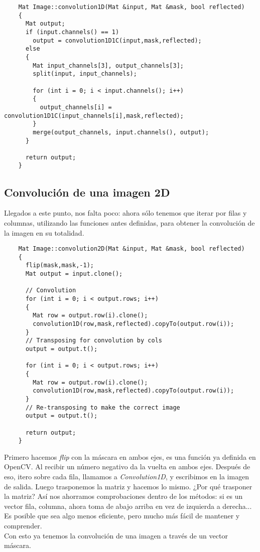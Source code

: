 \documentclass[a4paper, 11pt]{article}
\theoremstyle{definition}
\begin{document}
  \begin{lstlisting}
    Mat Image::convolution1D(Mat &input, Mat &mask, bool reflected)
    {
      Mat output;
      if (input.channels() == 1)
        output = convolution1D1C(input,mask,reflected);
      else
      {
        Mat input_channels[3], output_channels[3];
        split(input, input_channels);

        for (int i = 0; i < input.channels(); i++)
        {
          output_channels[i] = convolution1D1C(input_channels[i],mask,reflected);
        }
        merge(output_channels, input.channels(), output);
      }

      return output;
    }
  \end{lstlisting}

  \subsection{Convolución de una imagen 2D}

  Llegados a este punto, nos falta poco: ahora sólo tenemos que iterar por filas
  y columnas, utilizando las funciones antes definidas, para obtener la convolución
  de la imagen en su totalidad.

  \begin{lstlisting}
    Mat Image::convolution2D(Mat &input, Mat &mask, bool reflected)
    {
      flip(mask,mask,-1);
      Mat output = input.clone();

      // Convolution
      for (int i = 0; i < output.rows; i++)
      {
        Mat row = output.row(i).clone();
        convolution1D(row,mask,reflected).copyTo(output.row(i));
      }
      // Transposing for convolution by cols
      output = output.t();

      for (int i = 0; i < output.rows; i++)
      {
        Mat row = output.row(i).clone();
        convolution1D(row,mask,reflected).copyTo(output.row(i));
      }
      // Re-transposing to make the correct image
      output = output.t();

      return output;
    }
  \end{lstlisting}

  Primero hacemos \textit{flip} con la máscara en ambos ejes, es una función ya
  definida en OpenCV. Al recibir un número negativo da la vuelta en ambos ejes.
  Después de eso, itero sobre cada fila, llamamos a \textit{Convolution1D}, y escribimos
  en la imagen de salida. Luego trasponemos la matriz y hacemos lo mismo. ¿Por qué
  trasponer la matriz? Así nos ahorramos comprobaciones dentro de los métodos: si es
  un vector fila, columna, ahora toma de abajo arriba en vez de izquierda a derecha...
  Es posible que sea algo menos eficiente, pero mucho más fácil de mantener y comprender.\\

  Con esto ya tenemos la convolución de una imagen a través de un vector máscara.
\end{document}
